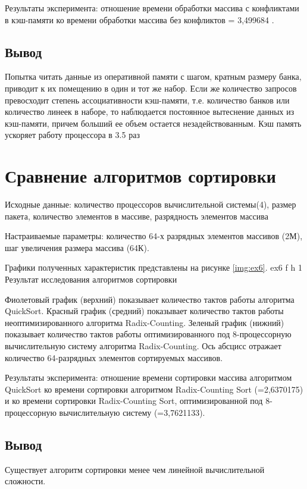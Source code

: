 Результаты эксперимента: отношение времени обработки массива с конфликтами в кэш-памяти ко времени обработки массива без конфликтов = 3,499684 .

\section*{Вывод}
Попытка читать данные из оперативной памяти с шагом, кратным размеру банка, приводит к их помещению в один и тот же набор.
Если же количество запросов превосходит степень ассоциативности кэш-памяти, т.е. количество банков или количество линеек в наборе,
то наблюдается постоянное вытеснение данных из кэш-памяти, причем больший ее объем остается незадействованным.
Кэш память ускоряет работу процессора в 3.5 раз


\chapter{Сравнение алгоритмов сортировки}

Исходные данные: количество процессоров вычислительной системы(4), размер пакета, количество элементов в массиве, разрядность элементов массива

Настраиваемые параметры: количество 64-х разрядных элементов массивов (2М), шаг увеличения размера массива (64К).

Графики полученных характеристик представлены на рисунке \ref{img:ex6}.
{ex6}
{f}
{h}
{1\textwidth}
{Результат  исследования алгоритмов сортировки}

Фиолетовый график (верхний) показывает количество тактов работы алгоритма QuickSort.
Красный график (средний) показывает  количество тактов работы неоптимизированного алгоритма Radix-Counting.
Зеленый график (нижний) показывает количество тактов работы оптимизированного под 8-процессорную вычислительную систему алгоритма Radix-Counting.
Ось абсцисс отражает количество 64-разрядных элементов сортируемых массивов.

Результаты эксперимента: отношение времени сортировки массива алгоритмом QuickSort ко времени сортировки алгоритмом Radix-Counting Sort (=2,6370175)
и ко времени сортировки Radix-Counting Sort, оптимизированной под 8-процессорную вычислительную систему (=3,7621133).

\section*{Вывод}
Существует алгоритм сортировки менее чем линейной вычислительной сложности.

